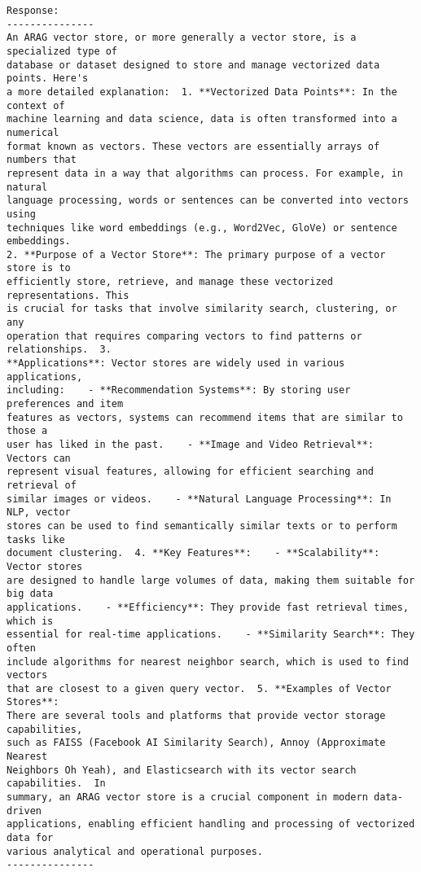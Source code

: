 \documentclass[11pt]{article}
\begin{document}
    \begin{Verbatim}[commandchars=\\\{\}]
Response:
---------------
An ARAG vector store, or more generally a vector store, is a specialized type of
database or dataset designed to store and manage vectorized data points. Here's
a more detailed explanation:  1. **Vectorized Data Points**: In the context of
machine learning and data science, data is often transformed into a numerical
format known as vectors. These vectors are essentially arrays of numbers that
represent data in a way that algorithms can process. For example, in natural
language processing, words or sentences can be converted into vectors using
techniques like word embeddings (e.g., Word2Vec, GloVe) or sentence embeddings.
2. **Purpose of a Vector Store**: The primary purpose of a vector store is to
efficiently store, retrieve, and manage these vectorized representations. This
is crucial for tasks that involve similarity search, clustering, or any
operation that requires comparing vectors to find patterns or relationships.  3.
**Applications**: Vector stores are widely used in various applications,
including:    - **Recommendation Systems**: By storing user preferences and item
features as vectors, systems can recommend items that are similar to those a
user has liked in the past.    - **Image and Video Retrieval**: Vectors can
represent visual features, allowing for efficient searching and retrieval of
similar images or videos.    - **Natural Language Processing**: In NLP, vector
stores can be used to find semantically similar texts or to perform tasks like
document clustering.  4. **Key Features**:    - **Scalability**: Vector stores
are designed to handle large volumes of data, making them suitable for big data
applications.    - **Efficiency**: They provide fast retrieval times, which is
essential for real-time applications.    - **Similarity Search**: They often
include algorithms for nearest neighbor search, which is used to find vectors
that are closest to a given query vector.  5. **Examples of Vector Stores**:
There are several tools and platforms that provide vector storage capabilities,
such as FAISS (Facebook AI Similarity Search), Annoy (Approximate Nearest
Neighbors Oh Yeah), and Elasticsearch with its vector search capabilities.  In
summary, an ARAG vector store is a crucial component in modern data-driven
applications, enabling efficient handling and processing of vectorized data for
various analytical and operational purposes.
---------------

    \end{Verbatim}
\end{document}
